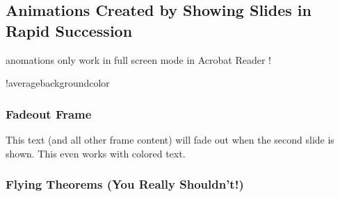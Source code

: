   \subsection{Animations Created by Showing Slides in Rapid Succession}
  \newcount\opaqueness
  \begin{frame}
  anomations only work in full screen mode in Acrobat Reader !
  \begin{colormixin}{\the\opaqueness!averagebackgroundcolor}
  \frametitle{Fadeout Frame}
  This text (and all other frame content) will fade out when the
  second slide is shown. This even works with
{\color{green!90!black}colored} \alert{text}.
\end{colormixin}
\end{frame}
\newcount\opaqueness
\newdimen\offset
\begin{frame}
\frametitle{Flying Theorems (You Really Shouldn't!)}
\end{frame}
